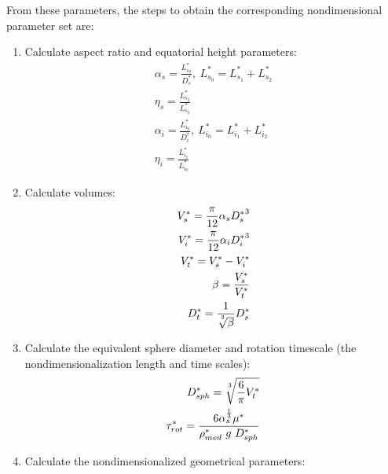 \documentclass[10pt,a4paper]{article}
\def\non{\nonumber}
\begin{document}
From these parameters, the steps to obtain the corresponding nondimensional parameter set are:
\begin{enumerate}
	\item Calculate aspect ratio and equatorial height parameters:
	\begin{eqnarray}\label{d2ndpars1}
		\alpha_s = \frac{L^*_{s_0}}{D^*_s}, ~ L^*_{s_0} = L^*_{s_1} + L^*_{s_2} \non \\
		\eta_s = \frac{L^*_{s_2}}{L^*_{s_0}} \non \\
		\alpha_{i} = \frac{L^*_{i_0}}{D^*_i}, ~ L^*_{i_0} = L^*_{i_1} + L^*_{i_2} \non \\
		\eta_{i} = \frac{L^*_{i_2}}{L^*_{i_0}}
	\end{eqnarray}
	\item Calculate volumes:
	\begin{eqnarray}\label{d2ndpars2}
		V_s^* = \frac{\pi}{12} \alpha_s {D_s^*}^3 \non \\
		V_i^* = \frac{\pi}{12} \alpha_i {D_i^*}^3 \non \\
		V_t^* = V_s^* - V_i^* \non \\
		\beta = \frac{V_s^*}{V_t^*} \non \\
		D_t^* = \frac{1}{\sqrt[\uproot{5}3]{\beta}} D_s^*
	\end{eqnarray}
	\item Calculate the equivalent sphere diameter and rotation timescale (the nondimensionalization length and time scales):
	\begin{eqnarray}\label{d2ndpars3}
		D_{sph}^* = \sqrt[\uproot{5}3]{\frac{6}{\pi} V_t^*} \non \\
		\tau^*_{rot} = \frac{6 \alpha_s^{\frac{1}{3}} \mu^*}{\rho^*_{med} ~ g ~ D_{sph}^*}
	\end{eqnarray}
	\item Calculate the nondimensionalized geometrical parameters:

\end{enumerate}
\end{document}
